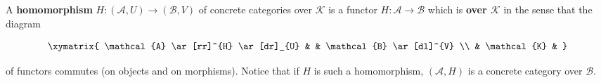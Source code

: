 A \textbf{homomorphism} $H: (\mathcal{A}, U) \to (\mathcal{B}, V)$ of concrete categories over $\mathcal{K}$ is a functor $H: \mathcal{A} \to \mathcal{B}$ which is \textbf{over $\mathcal{K}$} in the sense that the diagram

$$\xymatrix{
\mathcal{A} \ar[rr]^{H} \ar[dr]_{U} & & \mathcal{B} \ar[dl]^{V} \\
& \mathcal{K} &
}$$

of functors commutes (on objects and on morphisms). Notice that if $H$ is such a homomorphism, $(\mathcal{A}, H)$ is a concrete category over $\mathcal{B}$.
